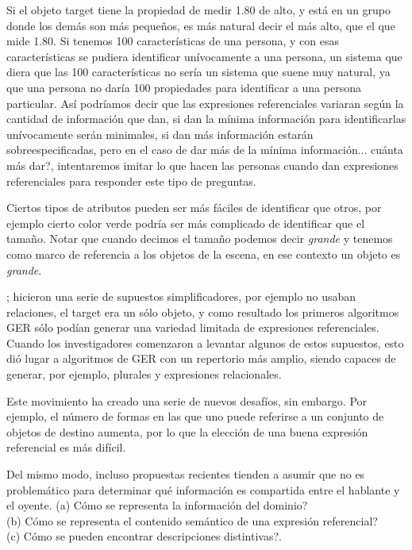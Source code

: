 Si el objeto target tiene la propiedad de medir 1.80 de alto, y est\'a en un grupo donde los dem\'as son m\'as peque\~nos, es m\'as natural decir el m\'as alto, que el que mide 1.80.
Si tenemos 100 caracter\'isticas de una persona, y con esas caracter\'isticas se pudiera identificar un\'ivocamente a una persona, un sistema que diera que las 100 caracter\'isticas no ser\'ia un sistema que suene muy natural, ya que una persona no dar\'ia 100 propiedades para identificar a una persona particular. As\'i podr\'iamos decir que las expresiones referenciales variaran seg\'un la cantidad de informaci\'on que dan, si dan la m\'inima informaci\'on para identificarlas un\'ivocamente ser\'an minimales, si dan m\'as informaci\'on estar\'an sobreespecificadas, pero en el caso de dar m\'as de la m\'inima informaci\'on... cu\'anta m\'as dar?, intentaremos imitar lo que hacen las personas cuando dan expresiones referenciales para responder este tipo de preguntas.

Ciertos tipos de atributos pueden ser m\'as f\'aciles de identificar que otros, por ejemplo cierto color verde podr\'{i}a ser m\'as complicado de identificar que el tama\~no. Notar que cuando decimos el tama\~no podemos decir {\it grande} y tenemos como marco de referencia a los objetos de la escena, en ese contexto un objeto es {\it grande}.

\cite{C92-1038}; \cite{Dale95computationalinterpretations} hicieron una serie de supuestos simplificadores, por ejemplo no usaban relaciones, el target era un s\'olo objeto, y como resultado los primeros
algoritmos GER s\'olo pod\'ian generar una variedad limitada de expresiones referenciales. Cuando
los investigadores comenzaron a levantar algunos de estos supuestos, esto di\'o lugar a algoritmos de GER
con un repertorio m\'as amplio, siendo capaces de generar, por ejemplo, plurales y expresiones relacionales. 

Este movimiento ha creado una serie de nuevos desaf\'ios, sin embargo. Por ejemplo, el
n\'umero de formas en las que uno puede referirse a un conjunto de objetos de destino aumenta, por lo que la elecci\'on de una
buena expresi\'on referencial es m\'as dif\'icil.

Del mismo modo, incluso propuestas recientes tienden a asumir que no es problem\'atico para determinar qu\'e informaci\'on
es compartida entre el hablante y el oyente.
(a) C\'omo se representa la informaci\'on del dominio?\\
(b) C\'omo se representa el contenido sem\'antico de una expresi\'on referencial? \\
(c) C\'omo se pueden encontrar descripciones distintivas?.\\

